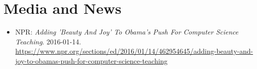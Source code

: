 \section{Media and News}

\vspace{6pt}

\begin{itemize}

  \setlength\itemsep{1em}


    \item{NPR: \textit{Adding 'Beauty And Joy' To Obama's Push For Computer Science Teaching}. 2016-01-14.}
    \newline
    \small{\href{https://www.npr.org/sections/ed/2016/01/14/462954645/adding-beauty-and-joy-to-obamas-push-for-computer-science-teaching}{https://www.npr.org/sections/ed/2016/01/14/462954645/adding-beauty-and-joy-to-obamas-push-for-computer-science-teaching}}

\end{itemize}

\vspace{2pt}